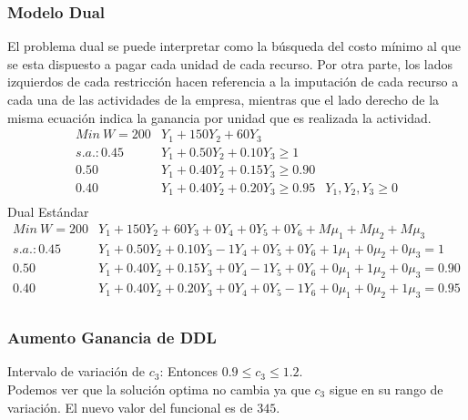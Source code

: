 \begin{homeworkProblem}[-1][Heladería]
\subsubsection{Modelo Dual}
El problema dual se puede interpretar como la búsqueda del costo mínimo al que se esta dispuesto a pagar cada unidad de cada recurso. Por otra parte, los lados izquierdos de cada restricción hacen referencia a la imputación de cada recurso a cada una de las actividades de la empresa, mientras que el lado derecho de la misma ecuación indica la ganancia por unidad que es realizada la actividad.
\begin{align*}
    Min\ W = 200&Y_1 +150Y_2 + 60Y_3 \\
    s.a.: 0.45&Y_1 + 0.50Y_2 +0.10Y_3 \ge 1\\
          0.50&Y_1 + 0.40Y_2 +0.15Y_3 \ge 0.90\\
          0.40&Y_1 + 0.40Y_2 +0.20Y_3 \ge 0.95
          &Y_1,Y_2,Y_3 \ge 0\\
\end{align*}
Dual Estándar 
\begin{align*}
    Min\ W = 200&Y_1 +150Y_2 + 60Y_3 + 0Y_4 + 0Y_5 + 0Y_6 + M\mu_1 + M\mu_2 + M\mu_3 \\
    s.a.: 0.45&Y_1 + 0.50Y_2 +0.10Y_3 - 1Y_4 + 0Y_5 + 0Y_6 + 1\mu_1 + 0\mu_2 + 0\mu_3 = 1\\
          0.50&Y_1 + 0.40Y_2 +0.15Y_3 + 0Y_4 - 1Y_5 + 0Y_6 + 0\mu_1 + 1\mu_2 + 0\mu_3 = 0.90\\
          0.40&Y_1 + 0.40Y_2 +0.20Y_3 + 0Y_4 + 0Y_5 - 1Y_6 + 0\mu_1 + 0\mu_2 + 1\mu_3 = 0.95\\
\end{align*}

\subsubsection{Aumento Ganancia de DDL}
Intervalo de variación de $c_3$:
Entonces   $0.9 \le c_3 \le 1.2$. \\
Podemos ver que la solución optima no cambia ya que $c_3$ sigue en su rango de variación.
El nuevo valor del funcional es de $345$.


\end{homeworkProblem}
